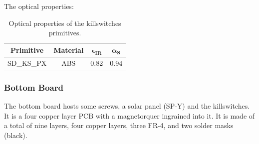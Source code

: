 \begin{table}[H]
\centering
{}
\caption{Bulk properties of the killswitches.}
\label{tab:tablapcbbulk}
\end{table}

The optical properties:

\begin{table}[H]
  \centering
  \begin{tabular}{@{}cccc@{}}
  \toprule
  \textbf{Primitive} & \textbf{Material} & $\mathbf{\epsilon_{IR}}$ & $\mathbf{\alpha_{S}}$ \\ \midrule
  SD\_KS\_PX         & ABS               & 0.82                     & 0.94                  \\ \bottomrule
  \end{tabular}
  \caption{Optical properties of the killswitches primitives.}
\end{table}

\subsubsection{Bottom Board}
The bottom board hosts some screws, a solar panel (SP-Y) and the killswitches. It is a four copper layer
PCB with a magnetorquer ingrained into it. It is made of a total of nine layers, four copper layers, three FR-4,
and two solder masks (black). 

